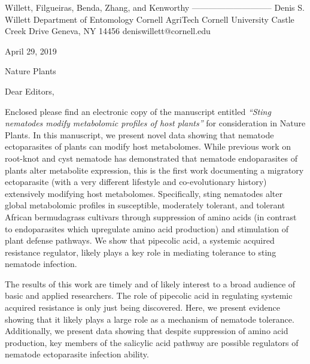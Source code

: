 \documentclass{article}
\begin{document}
\begin{addmargin}[2.8in]{}
Willett, Filgueiras, \newline
Benda, Zhang, and Kenworthy \newline
----------------------------- \newline
Denis S. Willett\newline
Department of Entomology \newline
Cornell AgriTech  \newline
Cornell University  Castle Creek Drive \newline
Geneva, NY 14456 \newline
deniswillett@cornell.edu \newline
\end{addmargin}
\setlength{\parindent}{0cm}

April 29, 2019

\vspace{1.24em}

Nature Plants

\vspace{1.24em}

Dear Editors,

\vspace{0.48em}
\setlength{\parindent}{1.24cm}

Enclosed please find an electronic copy of the manuscript entitled \textit{“Sting nematodes modify metabolomic profiles of host plants”} for consideration in Nature Plants.  In this manuscript, we present novel data showing that nematode ectoparasites of plants can modify host metabolomes.  While previous work on root-knot and cyst nematode has demonstrated that nematode endoparasites of plants alter metabolite expression, this is the first work documenting a migratory ectoparasite (with a very different lifestyle and co-evolutionary history) extensively modifying host metabolomes.  Specifically, sting nematodes alter global metabolomic profiles in susceptible, moderately tolerant, and tolerant African bermudagrass cultivars through suppression of amino acids (in contrast to endoparasites which upregulate amino acid production) and stimulation of plant defense pathways.  We show that pipecolic acid, a systemic acquired resistance regulator, likely plays a key role in mediating tolerance to sting nematode infection.  


The results of this work are timely and of likely interest to a broad audience of basic and applied researchers. The role of pipecolic acid in regulating systemic acquired resistance is only just being discovered.  Here, we present evidence showing that it likely plays a large role as a mechanism of nematode tolerance.  Additionally, we present data showing that despite suppression of amino acid production, key members of the salicylic acid pathway are possible regulators of nematode ectoparasite infection ability.  
\end{document}
